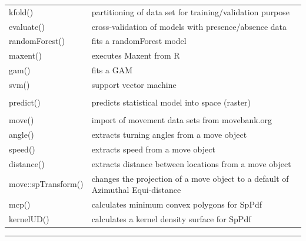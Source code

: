 \documentclass[10pt,landscape]{article}
\makeatletter
\renewcommand{\section}{\@startsection{section}{1}{0mm}%
                                {-1ex plus -.5ex minus -.2ex}%
                                {0.5ex plus .2ex}%
                                {\normalfont\large\bfseries}}
\makeatother
\begin{document}
\begin{multicols}{3}
\begin{tabular}{@{}p{\the\MyLen}%
                @{}p{\linewidth-\the\MyLen}@{}}
kfold() & partitioning of data set for training/validation purpose\\
evaluate() & cross-validation of models with presence/absence data\\               
randomForest() & fits a randomForest model  \\
maxent() & executes Maxent from R\\
gam() & fits a GAM \\
svm() & support vector machine \\
&  \\                
predict() & predicts statistical model into space (raster) \\

 & \\
move() & import of movement data sets from movebank.org  \\
angle() &  extracts turning angles from a move object\\
speed() & extracts speed from a move object \\  
distance() & extracts distance between locations from a move object \\
move::spTransform() & changes the projection of a move object to a default of Azimuthal Equi-distance \\
mcp() & calculates minimum convex polygons for SpPdf \\
kernelUD() & calculates a kernel density surface for SpPdf \\
\end{tabular}

\bigskip

\rule{0.32\textwidth}{0.4pt}
\scriptsize


% 
% 
% 


\end{multicols}
\end{document}
